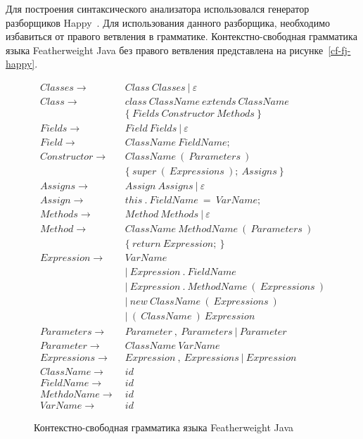 Для построения синтаксического анализатора использовался генератор разборщиков Happy~\cite{happy}.
Для использования данного разборщика, необходимо избавиться от правого ветвления в грамматике.
Контекстно-свободная грамматика языка Featherweight Java без правого ветвления представлена на рисунке~\ref{cf-fj-happy}.
\begin{figure}[htb]
    \begin{align*}
        Classes \rightarrow&\ Class\ Classes\ |\ \varepsilon\\
        Class \rightarrow&\ class\ ClassName\ extends\ ClassName\\
        &\ \{\ Fields\ Constructor\ Methods\ \}\\
        Fields \rightarrow&\ Field\ Fields\ |\ \varepsilon\\
        Field \rightarrow&\ ClassName\ FieldName;\\
        Constructor \rightarrow& \ ClassName\ (\ Parameters\ )\\
        &\ \{\ super\ (\ Expressions\ );\ Assigns\ \}\\
        Assigns \rightarrow&\ Assign\ Assigns\ |\ \varepsilon\\
        Assign \rightarrow&\ this\ .\ FieldName\ =\ VarName;\\
        Methods \rightarrow&\ Method\ Methods\ |\ \varepsilon\\
        Method \rightarrow&\ ClassName\ MethodName\ (\ Parameters\ )\\
        &\ \{\ return\ Expression;\ \}\\
        Expression \rightarrow&\ VarName\\
        &\ |\ Expression\ .\ FieldName\\
        &\ |\ Expression\ .\ MethodName\ (\ Expressions\ )\\
        &\ |\ new\ ClassName\ (\ Expressions\ )\\
        &\ |\ (\ ClassName\ )\ Expression\\
        Parameters \rightarrow&\ Parameter\ ,\ Parameters\ |\ Parameter\\
        Parameter \rightarrow&\ ClassName\ VarName\\
        Expressions \rightarrow&\ Expression\ ,\ Expressions\ |\ Expression\\
        ClassName \rightarrow&\ id\\
        FieldName \rightarrow&\ id\\
        MethdoName \rightarrow&\ id\\
        VarName \rightarrow&\ id
    \end{align*}
    \caption{Контекстно-свободная грамматика языка Featherweight Java}
    \label{cf-fj}
\end{figure}

